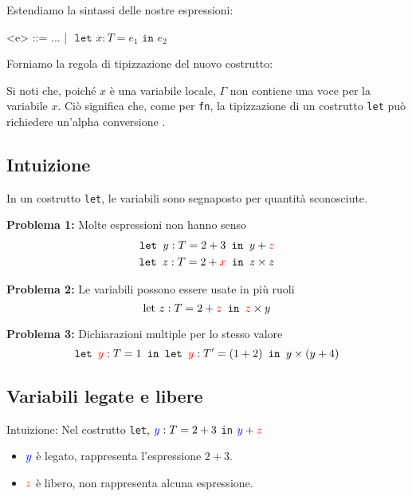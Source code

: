 Estendiamo la sintassi delle nostre espressioni: 
\begin{grammar}
    <e> ::= ... | $\texttt{ let  }x : T = e_1 \texttt{ in } e_2$
\end{grammar}

Forniamo la regola di tipizzazione del nuovo costrutto:

\begin{prooftree}
\end{prooftree}


Si noti che, poiché $x$ è una variabile locale, $\Gamma$ non contiene una voce per la variabile
$x$. Ciò significa che, come per \texttt{fn}, la tipizzazione di un costrutto \texttt{let} può
richiedere un'alpha conversione .

\subsection{Intuizione}
In un costrutto \texttt{let}, le variabili sono segnaposto per quantità sconosciute.

\textbf{Problema 1:} Molte espressioni non hanno senso
\[
\begin{aligned}
    \texttt{let } y:T = 2+3 \texttt{ in } y+\textcolor{red}{z} \\
    \texttt{let } z:T = 2+\textcolor{red}{x} \texttt{ in } z \times z
\end{aligned}
\]

\textbf{Problema 2:} Le variabili possono essere usate in più ruoli
\[ \text{let } z:T = 2+\textcolor{red}{z} \texttt{ in } \textcolor{red}{z} \times y \]

\textbf{Problema 3:} Dichiarazioni multiple per lo stesso valore
\[ \texttt{let } \textcolor{red}{y}:T = 1 \texttt{ in let }
\textcolor{red}{y}:T' = (1+2) \texttt{ in } y \times (y+4) \]

\subsection{Variabili legate e libere}
Intuizione: Nel costrutto \texttt{let}, $\textcolor{blue}{y}:T = 2+3$ \texttt{in} $\textcolor{blue}{y}+
\textcolor{red}{z}$
\begin{itemize}
    \item $\textcolor{blue}{y}$ è legato, rappresenta l'espressione $2+3$.
    \item $\textcolor{red}{z}$ è libero, non rappresenta alcuna espressione.
\end{itemize}

